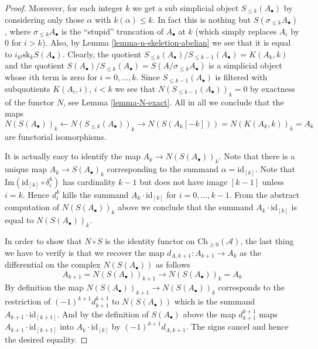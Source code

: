 \begin{proof}
\medskip\noindent
Moreover, for each integer $k$ we get a sub simplicial
object $S_{\leq k}(A_\bullet)$ by considering
only those $\alpha$ with $k(\alpha) \leq k$.
In fact this is nothing but $S(\sigma_{\leq k}A_\bullet)$,
where $\sigma_{\leq k}A_\bullet$ is the ``stupid'' truncation
of $A_\bullet$ at $k$ (which simply replaces $A_i$ by
$0$ for $i > k$). Also, by Lemma \ref{lemma-n-skeletion-abelian}
we see that it is equal to $i_{k!}\text{sk}_k S(A_\bullet)$.
Clearly, the quotient
$S_{\leq k}(A_\bullet)/S_{\leq k - 1}(A_\bullet) = K(A_k, k)$
and the quotient
$S(A_\bullet)/S_{\leq k}(A_\bullet) = S(A/\sigma_{\leq k}A_\bullet)$
is a simplicial object whose $i$th term is zero for $i = 0, \ldots, k$.
Since $S_{\leq k - 1}(A_\bullet)$ is filtered with
subquotients $K(A_i, i)$, $i < k$ we see that
$N(S_{\leq k - 1}(A_\bullet))_k = 0$ by exactness
of the functor $N$, see Lemma \ref{lemma-N-exact}.
All in all we conclude that the maps
$$
N(S(A_\bullet))_k
\leftarrow
N(S_{\leq k}(A_\bullet))_k
\to
N(S(A_k[-k])) = N(K(A_k, k))_k = A_k
$$
are functorial isomorphisms.

\medskip\noindent
It is actually easy to identify the map $A_k \to N(S(A_\bullet))_k$.
Note that there is a unique map $A_k \to S(A_\bullet)_k$
corresponding to the summand $\alpha = \text{id}_{[k]}$.
Note that $\text{Im}(\text{id}_{[k]} \circ \delta^k_i)$
has cardinality $k - 1$ but does not
have image $[k - 1]$ unless $i = k$. Hence
$d^k_i$ kills the summand $A_k \cdot \text{id}_{[k]}$
for $i = 0, \ldots, k - 1$. From the abstract computation
of $N(S(A_\bullet))_k$ above we conclude that
the summand $A_k \cdot \text{id}_{[k]}$ is equal to
$N(S(A_\bullet))_k$.

\medskip\noindent
In order to show that $N \circ S$ is the identity
functor on $\text{Ch}_{\geq 0}(\mathcal{A})$,
the last thing we have to verify
is that we recover the map $d_{A, k + 1} : A_{k + 1} \to A_k$
as the differential on the complex $N(S(A_\bullet))$
as follows
$$
A_{k + 1} = N(S(A_\bullet))_{k + 1} \to N(S(A_\bullet))_k = A_k
$$
By definition the map
$N(S(A_\bullet))_{k + 1} \to N(S(A_\bullet))_k$
corresponds to the restriction of $(-1)^{k + 1}d^{k + 1}_{k + 1}$
to $N(S(A_\bullet))$ which is
the summand $A_{k + 1} \cdot \text{id}_{[k + 1]}$.
And by the definition of $S(A_\bullet)$ above the
map $d^{k + 1}_{k + 1}$ maps $A_{k + 1} \cdot \text{id}_{[k + 1]}$
into $A_k \cdot \text{id}_{[k]}$ by $(-1)^{k + 1}d_{A, k + 1}$.
The signs cancel and hence the desired equality.


\end{proof}
